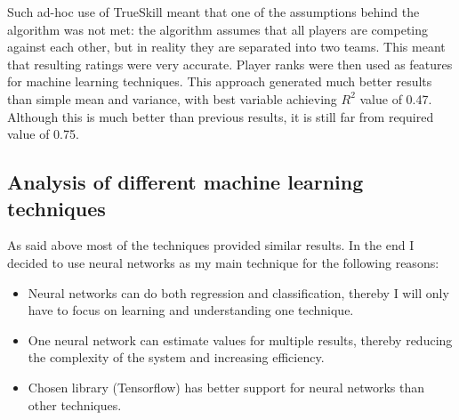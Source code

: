 \documentclass[12pt,a4paper]{book}
\begin{document}
Such ad-hoc use of TrueSkill meant that one of the assumptions behind the algorithm was not met:
the algorithm assumes that all players are competing against each other, but in reality they are separated into two teams.
This meant that resulting ratings were very accurate.
Player ranks were then used as features for machine learning techniques.
This approach generated much better results than simple mean and variance, with best variable achieving $R^2$ value of 0.47.
Although this is much better than previous results, it is still far from required value of 0.75.

\subsection{Analysis of different machine learning techniques}
As said above most of the techniques provided similar results.
In the end I decided to use neural networks as my main technique for the following reasons:
\begin{itemize}
\item Neural networks can do both regression and classification, thereby I will only have to focus on learning and understanding one technique.
\item One neural network can estimate values for multiple results, thereby reducing the complexity of the system and increasing efficiency.
\item Chosen library (Tensorflow) has better support for neural networks than other techniques.
\end{itemize}
\end{document}
